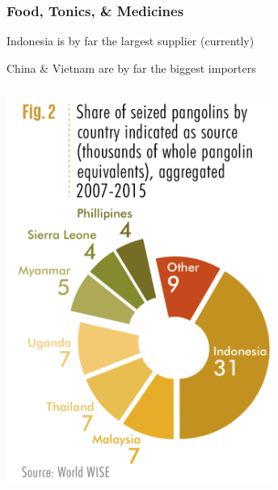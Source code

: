\documentclass[10pt]{beamer}
\begin{document}
\begin{frame}
\frametitle{Food, Tonics, \& Medicines}
\vspace{0.5cm}

	Indonesia is by far the largest \textcolor{myblue}{supplier} (currently)\\
	
	\vspace{0.5cm}
	
	China \& Vietnam are by far the biggest \textcolor{myblue}{importers}\\
	
	\vspace{0.25cm}
	
	\begin{columns}
		\begin{column}{0.5\textwidth}
			\begin{center}
				\includegraphics[width=0.65\textwidth]{figures/pangolin_illegal_export.png}
			\end{center}
		\end{column}
		

\end{columns}
\end{frame}
\end{document}

